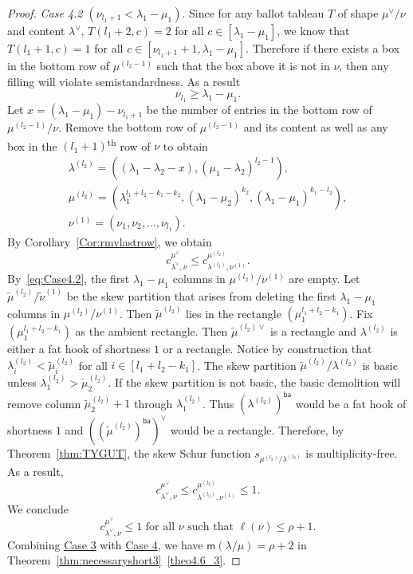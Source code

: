 \documentclass[10pt]{article}
\theoremstyle{definition}
\newcommand{\ba}{\mathsf{ba}}
\newcommand{\msf}{\mathsf{m}}
\let\hypertargeta\hypertarget %
\let\hyperlinka\hyperlink %
\newenvironment{Case}[1]{\par\vskip2pt\noindent%
\emph{#1}.}{\vskip2pt}
\begin{document}
\begin{proof}
\begin{Case}
{\hypertargeta{theo4.6_case4.2}{Case 4.2} $(\nu_{l_1+1} < \lambda_1-\mu_1)$} 
Since for any ballot tableau $T$ of shape $\mu^\vee/\nu$ and content $\lambda^\vee$, $T(l_1+2,c) = 2$ for all $c\in [\lambda_1-\mu_1]$, we know that $T(l_1+1,c) = 1$ for all $c\in [\nu_{l_1+1}+1,\lambda_1-\mu_1]$. Therefore if there exists a box in the bottom row of $\mu^{(l_2-1)}$ such that the box above it is not in $\nu$, then any filling will violate semistandardness. As a result
\begin{equation}
\label{eq:Case4.2}
 \nu_{l_1}\geq \lambda_1-\mu_1.
\end{equation}
Let $x = (\lambda_1-\mu_1)-\nu_{l_1+1}$ be the number of entries in the bottom row of $\mu^{(l_2-1)}/\nu$. Remove the bottom row of $\mu^{(l_2-1)}$ and its content as well as any box in the $(l_1+1)$\textsuperscript{th} row of $\nu$ to obtain
\[\begin{gathered}
\lambda^{(l_2)} = ((\lambda_1-\lambda_2-x),(\mu_1-\lambda_2)^{l_2-1}),
\\
\mu^{(l_2)} = (\lambda_1^{l_1+l_2-k_1-k_2}, (\lambda_1-\mu_2)^{k_2},(\lambda_1-\mu_1)^{k_1-l_2}),
\\
\nu^{(1)} = (\nu_1,\nu_2,\ldots,\nu_{l_1}).
\end{gathered}
\]
By Corollary~\ref{Cor:rmvlastrow}, we obtain
\[
c^{\mu^\vee}_{\lambda^\vee,\nu}\leq c^{\mu^{(l_2)}}_{\lambda^{(l_2)},\nu^{(1)}}.
\]
By~\eqref{eq:Case4.2}, the first $\lambda_1-\mu_1$ columns in $\mu^{(l_2)}/\nu^{(1)}$ are empty. Let $\tilde\mu^{(l_2)}/\tilde\nu^{(1)}$ be the skew partition that arises from deleting the first $\lambda_1-\mu_1$ columns in $\mu^{(l_2)}/\nu^{(1)}$.
Then $\tilde\mu^{(l_2)}$ lies in the rectangle $(\mu_1^{l_1+l_2-k_1})$. Fix $(\mu_1^{l_1+l_2-k_1})$ as the ambient rectangle. Then $\tilde\mu^{(l_2)\vee}$ is a rectangle and $\lambda^{(l_2)}$ is either a fat hook of shortness $1$ or a rectangle. Notice by construction that $\lambda^{(l_2)}_{i}< \tilde\mu^{(l_2)}_i$ for all $i\in [l_1+l_2-k_1]$. The skew partition $\tilde\mu^{(l_2)}/\lambda^{(l_2)}$ is basic unless $\lambda^{(l_2)}_1> \tilde\mu^{(l_2)}_2$. If the skew partition is not basic, the basic demolition will remove column $\tilde\mu^{(l_2)}_2+1$ through $\lambda^{(l_2)}_1$. Thus $(\lambda^{(l_2)})^{\ba }$ would be a fat hook of shortness $1$ and $((\tilde\mu^{(l_2)})^{\ba })^\vee$ would be a rectangle. 
Therefore, by Theorem~\ref{thm:TYGUT}, the skew Schur function $s_{\mu^{(l_2)}/\lambda^{(l_2)}}$ is multiplicity-free. As a result,
\[
c^{\mu^\vee}_{\lambda^\vee,\nu} \leq c^{ \mu^{(l_2)}}_{\lambda^{(l_2)},\nu^{(1)}} \leq 1.
\]
We conclude
\[
c^{\mu^\vee}_{\lambda^\vee,\nu} \leq 1 \text{ for all }\nu\text{ such that }\ell(\nu)\leq \rho+1.
\]
Combining \hyperlinka{theo4.6_case3}{Case 3} with \hyperlinka{theo4.6_case4}{Case 4}, we have ${\msf }(\lambda/\mu) = \rho+2$ in Theorem~\ref{thm:necessaryshort3}~\ref{theo4.6_3}.\qedhere
\end{Case}
\end{proof}
\end{document}

